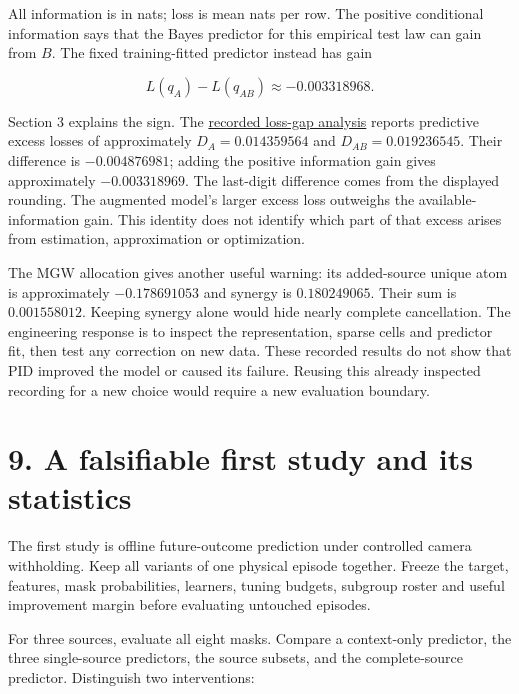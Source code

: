 \documentclass[11pt,a4paper]{article}
\begin{document}
All information is in nats; loss is mean nats per row. The positive conditional information says that the Bayes predictor for this empirical test law can gain from \(B\). The fixed training-fitted predictor instead has gain

\[
L(q_A)-L(q_{AB})\approx-0.003318968.
\]

Section 3 explains the sign. The \href{https://github.com/sepahead/pid-rs/blob/main/audit/evidence/occupancy-fixed-predictor-loss-decomposition-2026-09-10.md}{recorded loss-gap analysis} reports predictive excess losses of approximately \(D_A=0.014359564\) and \(D_{AB}=0.019236545\). Their difference is \(-0.004876981\); adding the positive information gain gives approximately \(-0.003318969\). The last-digit difference comes from the displayed rounding. The augmented model's larger excess loss outweighs the available-information gain. This identity does not identify which part of that excess arises from estimation, approximation or optimization.

The MGW allocation gives another useful warning: its added-source unique atom is approximately \(-0.178691053\) and synergy is \(0.180249065\). Their sum is \(0.001558012\). Keeping synergy alone would hide nearly complete cancellation. The engineering response is to inspect the representation, sparse cells and predictor fit, then test any correction on new data. These recorded results do not show that PID improved the model or caused its failure. Reusing this already inspected recording for a new choice would require a new evaluation boundary.

\par{}

\section{9. A falsifiable first study and its statistics}\label{a-falsifiable-first-study-and-its-statistics}

The first study is offline future-outcome prediction under controlled camera withholding. Keep all variants of one physical episode together. Freeze the target, features, mask probabilities, learners, tuning budgets, subgroup roster and useful improvement margin before evaluating untouched episodes.

For three sources, evaluate all eight masks. Compare a context-only predictor, the three single-source predictors, the source subsets, and the complete-source predictor. Distinguish two interventions:
\end{document}
